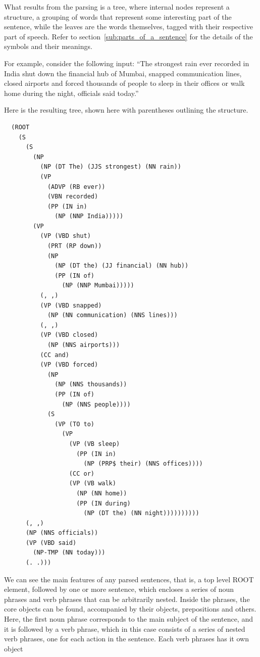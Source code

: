 What results from the parsing is a tree, where internal nodes represent a structure, a grouping of words that represent some interesting part of the sentence, while the leaves are the words themselves, tagged with their respective part of speech. Refer to section~\ref{sub:parts_of_a_sentence} for the details of the symbols and their meanings.

For example, consider the following input: ``The strongest rain ever recorded in India shut down the financial hub of Mumbai, snapped communication lines, closed airports and forced thousands of people to sleep in their offices or walk home during the night, officials said today.''

Here is the resulting tree, shown here with parentheses outlining the structure.
\begin{verbatim}
  (ROOT
    (S
      (S
        (NP
          (NP (DT The) (JJS strongest) (NN rain))
          (VP
            (ADVP (RB ever))
            (VBN recorded)
            (PP (IN in)
              (NP (NNP India)))))
        (VP
          (VP (VBD shut)
            (PRT (RP down))
            (NP
              (NP (DT the) (JJ financial) (NN hub))
              (PP (IN of)
                (NP (NNP Mumbai)))))
          (, ,)
          (VP (VBD snapped)
            (NP (NN communication) (NNS lines)))
          (, ,)
          (VP (VBD closed)
            (NP (NNS airports)))
          (CC and)
          (VP (VBD forced)
            (NP
              (NP (NNS thousands))
              (PP (IN of)
                (NP (NNS people))))
            (S
              (VP (TO to)
                (VP
                  (VP (VB sleep)
                    (PP (IN in)
                      (NP (PRP$ their) (NNS offices))))
                  (CC or)
                  (VP (VB walk)
                    (NP (NN home))
                    (PP (IN during)
                      (NP (DT the) (NN night))))))))))
      (, ,)
      (NP (NNS officials))
      (VP (VBD said)
        (NP-TMP (NN today)))
      (. .)))
\end{verbatim}

We can see the main features of any parsed sentences, that is, a top level ROOT element, followed by one or more sentence, which encloses a series of noun phrases and verb phrases that can be arbitrarily nested. Inside the phrases, the core objects can be found, accompanied by their objects, prepositions and others. Here, the first noun phrase corresponds to the main subject of the sentence, and it is followed by a verb phrase, which in this case consists of a series of nested verb phrases, one for each action in the sentence. Each verb phrases has it own object

